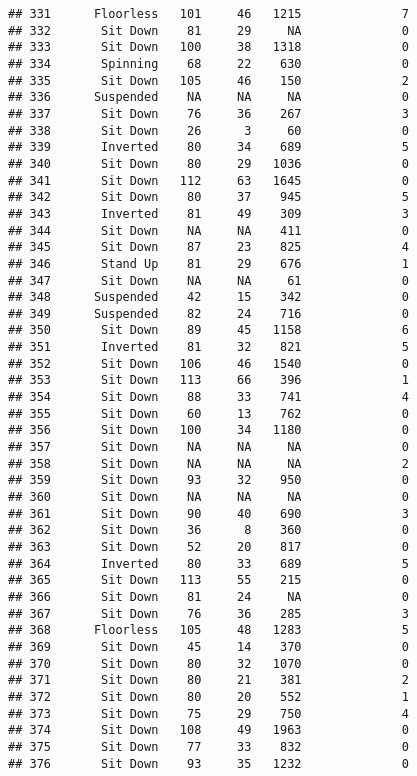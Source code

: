 \documentclass[
]{article}
\begin{document}
\begin{verbatim}
## 331      Floorless   101     46   1215              7
## 332       Sit Down    81     29     NA              0
## 333       Sit Down   100     38   1318              0
## 334       Spinning    68     22    630              0
## 335       Sit Down   105     46    150              2
## 336      Suspended    NA     NA     NA              0
## 337       Sit Down    76     36    267              3
## 338       Sit Down    26      3     60              0
## 339       Inverted    80     34    689              5
## 340       Sit Down    80     29   1036              0
## 341       Sit Down   112     63   1645              0
## 342       Sit Down    80     37    945              5
## 343       Inverted    81     49    309              3
## 344       Sit Down    NA     NA    411              0
## 345       Sit Down    87     23    825              4
## 346       Stand Up    81     29    676              1
## 347       Sit Down    NA     NA     61              0
## 348      Suspended    42     15    342              0
## 349      Suspended    82     24    716              0
## 350       Sit Down    89     45   1158              6
## 351       Inverted    81     32    821              5
## 352       Sit Down   106     46   1540              0
## 353       Sit Down   113     66    396              1
## 354       Sit Down    88     33    741              4
## 355       Sit Down    60     13    762              0
## 356       Sit Down   100     34   1180              0
## 357       Sit Down    NA     NA     NA              0
## 358       Sit Down    NA     NA     NA              2
## 359       Sit Down    93     32    950              0
## 360       Sit Down    NA     NA     NA              0
## 361       Sit Down    90     40    690              3
## 362       Sit Down    36      8    360              0
## 363       Sit Down    52     20    817              0
## 364       Inverted    80     33    689              5
## 365       Sit Down   113     55    215              0
## 366       Sit Down    81     24     NA              0
## 367       Sit Down    76     36    285              3
## 368      Floorless   105     48   1283              5
## 369       Sit Down    45     14    370              0
## 370       Sit Down    80     32   1070              0
## 371       Sit Down    80     21    381              2
## 372       Sit Down    80     20    552              1
## 373       Sit Down    75     29    750              4
## 374       Sit Down   108     49   1963              0
## 375       Sit Down    77     33    832              0
## 376       Sit Down    93     35   1232              0

\end{verbatim}
\end{document}
